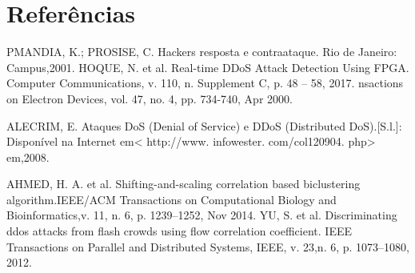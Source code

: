 \documentclass[conference]{IEEEtran}
\begin{document}
	
	\section*{Referências}
	\renewcommand{\section}[2]{}
	
	\begin{thebibliography}{00}
		  PMANDIA, K.; PROSISE, C. Hackers resposta e contraataque. Rio de Janeiro: Campus,2001.
		HOQUE, N. et al. Real-time DDoS Attack Detection Using FPGA. Computer Communications, v. 110, n. Supplement C, p. 48 – 58, 2017.
		nsactions on Electron Devices, vol. 47, no. 4, pp. 734-740, Apr 2000.
		
		ALECRIM, E. Ataques DoS (Denial of Service) e DDoS (Distributed DoS).[S.l.]: Disponível na Internet em< http://www. infowester. com/col120904. php> em,2008.
		
		 AHMED, H. A. et al. Shifting-and-scaling correlation based biclustering algorithm.IEEE/ACM Transactions on Computational Biology and Bioinformatics,v. 11, n. 6, p. 1239–1252, Nov 2014.
		 YU, S. et al. Discriminating ddos attacks from flash crowds using flow correlation coefficient. IEEE Transactions on Parallel and Distributed Systems, IEEE, v. 23,n. 6, p. 1073–1080, 2012.
	
	\end{thebibliography}
	
	
\end{document}
